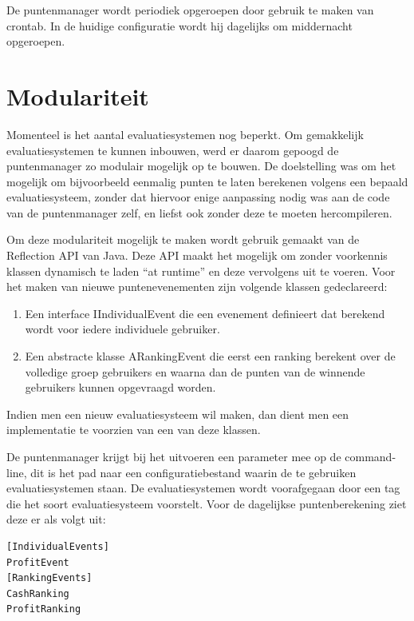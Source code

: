 De puntenmanager wordt periodiek opgeroepen door gebruik te maken van crontab. In de huidige configuratie wordt hij dagelijks om middernacht opgeroepen.

\section{Modulariteit}

Momenteel is het aantal evaluatiesystemen nog beperkt. Om gemakkelijk evaluatiesystemen te kunnen inbouwen, werd er daarom gepoogd de puntenmanager zo modulair mogelijk op te bouwen. De doelstelling was om het mogelijk om bijvoorbeeld eenmalig punten te laten berekenen volgens een bepaald evaluatiesysteem, zonder dat hiervoor enige aanpassing nodig was aan de code van de puntenmanager zelf, en liefst ook zonder deze te moeten hercompileren.

Om deze modulariteit mogelijk te maken wordt gebruik gemaakt van de Reflection API van Java. Deze API maakt het mogelijk om zonder voorkennis klassen dynamisch te laden ``at runtime'' en deze vervolgens uit te voeren. Voor het maken van nieuwe puntenevenementen zijn volgende klassen gedeclareerd:

\begin{enumerate}
\item Een interface IIndividualEvent die een evenement definieert dat berekend wordt voor iedere individuele gebruiker.
\item Een abstracte klasse ARankingEvent die eerst een ranking berekent over de volledige groep gebruikers en waarna dan de punten van de winnende gebruikers kunnen opgevraagd worden.
\end{enumerate}

Indien men een nieuw evaluatiesysteem wil maken, dan dient men een implementatie te voorzien van een van deze klassen.

De puntenmanager krijgt bij het uitvoeren een parameter mee op de command-line, dit is het pad naar een configuratiebestand waarin de te gebruiken evaluatiesystemen staan. De  evaluatiesystemen wordt voorafgegaan door een tag die het soort evaluatiesysteem voorstelt. Voor de dagelijkse puntenberekening ziet deze er als volgt uit:

\begin{verbatim}
[IndividualEvents]
ProfitEvent
[RankingEvents]
CashRanking
ProfitRanking
\end{verbatim}

